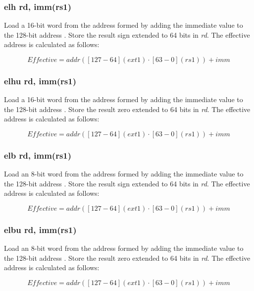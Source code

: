 \documentclass{article}
\begin{document}
\subsubsection{elh rd, imm(rs1)}
Load a 16-bit word from the address formed by adding the immediate value to the 
128-bit address .  Store the result sign extended to 64 bits in \textit{rd}.  The effective 
address is calculated as follows: 

\begin{equation}
Effective = addr([127-64](ext1) \cdot [63-0](rs1))+imm
\end{equation}

\subsubsection{elhu rd, imm(rs1)}
Load a 16-bit word from the address formed by adding the immediate value to the 
128-bit address .  Store the result zero extended to 64 bits in \textit{rd}.  The effective 
address is calculated as follows: 

\begin{equation}
Effective = addr([127-64](ext1) \cdot [63-0](rs1))+imm
\end{equation}

\subsubsection{elb rd, imm(rs1)}
Load an 8-bit word from the address formed by adding the immediate value to the 
128-bit address .  Store the result sign extended to 64 bits in \textit{rd}.  The effective 
address is calculated as follows: 

\begin{equation}
Effective = addr([127-64](ext1) \cdot [63-0](rs1))+imm
\end{equation}

\subsubsection{elbu rd, imm(rs1)}
Load an 8-bit word from the address formed by adding the immediate value to the 
128-bit address .  Store the result zero extended to 64 bits in \textit{rd}.  The effective 
address is calculated as follows: 

\begin{equation}
Effective = addr([127-64](ext1) \cdot [63-0](rs1))+imm
\end{equation}
\end{document}
